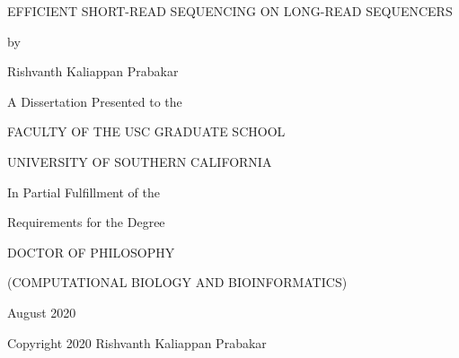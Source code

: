 \documentclass[12pt]{report}
\begin{document}
\begin{titlepage}
\centering
  \vspace*{2cm}
  \MakeUppercase{Efficient short-read sequencing on long-read sequencers}
  \vspace{1cm}
  \par
  by
  \vspace{1cm}
  \par
  {Rishvanth Kaliappan Prabakar}

  \vspace{3cm}
  \par
  A Dissertation Presented to the
  \par
  \MakeUppercase{Faculty of the USC graduate school}
  \par
  \MakeUppercase{University of Southern California}
  \par
  In Partial Fulfillment of the
  \par
  Requirements for the Degree
  \par
  \MakeUppercase{Doctor of Philosophy}
  \par
  \MakeUppercase{(Computational Biology and Bioinformatics)}

  \vspace{3cm}
  August 2020

  \vfill
  \raggedleft
  Copyright 2020
  \hfill
  Rishvanth Kaliappan Prabakar
\end{titlepage}


\doublespacing
{}
\setcounter{page}{2}

\setlength{\epigraphwidth}{1.0\textwidth}
\setlength{\epigraphrule}{0pt}
\vspace*{2in}

\newpage

{}


\singlespacing

\tableofcontents
\listoffigures
\newpage

\doublespacing
{}
{}

\end{document}
